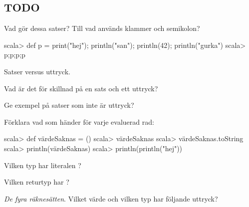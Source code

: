 {\Task \what

\Subtask

\SOLUTION

\TaskSolved \what

\SubtaskSolved 

\QUESTEND




\subsection{TODO}



\ifPreSolution  %


\Task\Pen Vad gör dessa satser? Till vad används klammer och semikolon? %
\begin{REPLnonum}
scala> def p = { print("hej"); println("san"); println(42); println("gurka") }
scala> p;p;p;p
\end{REPLnonum}

\Task\Pen Satser versus uttryck. %

\Subtask Vad är det för skillnad på en sats och ett uttryck?

\Subtask Ge exempel på satser som inte är uttryck?

\Subtask Förklara vad som händer för varje evaluerad rad:
\begin{REPL}
scala> def värdeSaknas = ()
scala> värdeSaknas
scala> värdeSaknas.toString
scala> println(värdeSaknas)
scala> println(println("hej"))
\end{REPL}

\Subtask Vilken typ har literalen \code{()}?

\Subtask Vilken returtyp har ?







\Task \textit{De fyra räknesätten}. Vilket värde och vilken typ har följande uttryck? %

}
